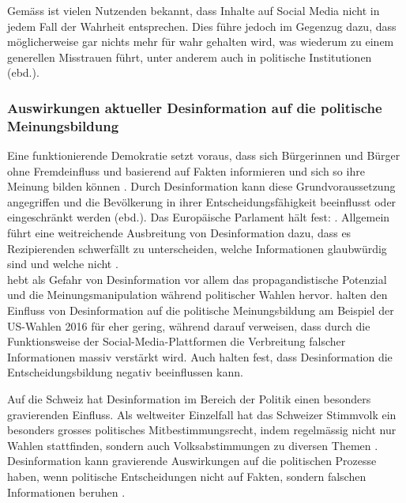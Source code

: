 \documentclass[12pt,a4paper]{article}        %
\begin{document}
Gemäss \textcite[183]{weidner_fake_2019} ist vielen Nutzenden bekannt, dass Inhalte auf Social Media nicht in jedem Fall der Wahrheit entsprechen. Dies führe jedoch im Gegenzug dazu, dass möglicherweise gar nichts mehr für wahr gehalten wird, was wiederum zu einem generellen Misstrauen führt, unter anderem auch in politische Institutionen (ebd.).

\subsubsection{Auswirkungen aktueller Desinformation auf die politische Meinungsbildung}
Eine funktionierende Demokratie setzt voraus, dass sich Bürgerinnen und Bürger ohne Fremdeinfluss und basierend auf Fakten informieren und sich so ihre Meinung bilden können \parencite[26]{vogler_wahrnehmung_2021}. Durch Desinformation kann diese Grundvoraussetzung angegriffen und die Bevölkerung in ihrer Entscheidungsfähigkeit beeinflusst oder eingeschränkt werden (ebd.).
Das Europäische Parlament hält fest:  \parencite[13]{european_parliament_directorate-general_for_external_policies_of_the_union_impact_2021} \parencites[vgl.\ auch][16]{reuter_fake_2019}[26]{vogler_wahrnehmung_2021}[19]{grujic_warnhinweise_2024}{schmidt_meinungsbildung_2022}. Allgemein führt eine weitreichende Ausbreitung von Desinformation dazu, dass es Rezipierenden schwerfällt zu unterscheiden, welche Informationen glaubwürdig sind und welche nicht \parencite[3697]{weikmann_visual_2023}.\\
\Textcite[170]{wahl_fake_2021} hebt als Gefahr von Desinformation vor allem das propagandistische Potenzial und die Meinungsmanipulation während politischer Wahlen hervor. \textcite{allcott_social_2017} halten den Einfluss von Desinformation auf die politische Meinungsbildung am Beispiel der US-Wahlen 2016 für eher gering, während \textcite[1095]{lazer_science_2018} darauf verweisen, dass durch die Funktionsweise der Social-Media-Plattformen die Verbreitung falscher Informationen massiv verstärkt wird. Auch \textcite[26]{vogler_wahrnehmung_2021} halten fest, dass Desinformation die Entscheidungsbildung negativ beeinflussen kann.

Auf die Schweiz hat Desinformation im Bereich der Politik einen besonders gravierenden Einfluss. Als weltweiter Einzelfall hat das Schweizer Stimmvolk ein besonders grosses politisches Mitbestimmungsrecht, indem regelmässig nicht nur Wahlen stattfinden, sondern auch Volksabstimmungen zu diversen Themen \parencite[2]{sager_politische_2017}. Desinformation kann gravierende Auswirkungen auf die politischen Prozesse haben, wenn politische Entscheidungen nicht auf Fakten, sondern falschen Informationen beruhen \parencites[26]{vogler_wahrnehmung_2021}[vgl.\ auch][19]{grujic_warnhinweise_2024}.
\end{document}
